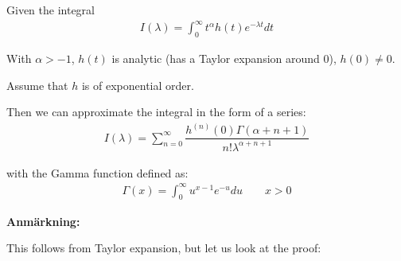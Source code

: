 \begin{lem}[Watson]{}
  Given the integral
  \begin{equation*}
    \begin{gathered}
      I(\lambda) = \int_{0}^{\infty}t^{\alpha}h(t)e^{-\lambda t}dt
    \end{gathered}
  \end{equation*}\par
  \noindent With $\alpha>-1$, $h(t)$ is analytic (has a Taylor expansion around 0), $h(0)\neq0$.\par
  \noindent Assume that $h$ is of exponential order.
  \par\bigskip
  \noindent Then we can approximate the integral in the form of a series:
  \begin{equation*}
    \begin{gathered}
      I(\lambda) = \sum_{n=0}^{\infty}\dfrac{h^{(n)}(0)\Gamma(\alpha+n+1)}{n!\lambda^{\alpha+n+1}}
    \end{gathered}
  \end{equation*}\par
  \noindent with the Gamma function defined as:
  \begin{equation*}
    \begin{gathered}
      \Gamma(x) = \int_{0}^{\infty}u^{x-1}e^{-u}du\qquad x>0
    \end{gathered}
  \end{equation*}
\end{lem}
\par\bigskip
\noindent\textbf{Anmärkning:}\par
\noindent This follows from Taylor expansion, but let us look at the proof:
\par\bigskip
